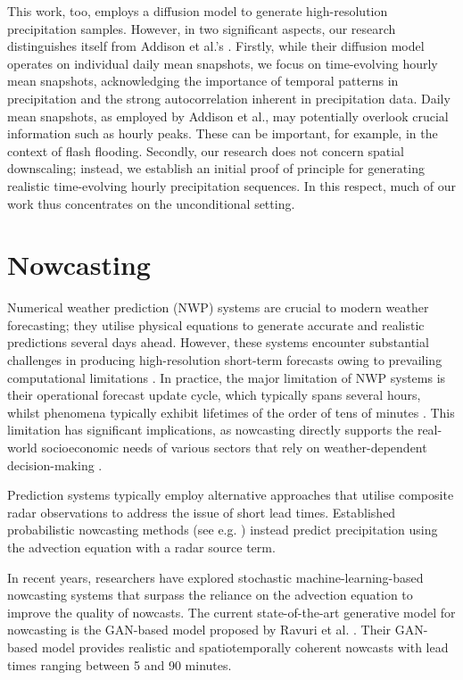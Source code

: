 \documentclass[ oneside,%
                    author={George Herbert},
                    degree={MSci},
                     title={Diffusion Models for Time-Evolving Precipitation Fields},
                  subtitle={}]{dissertation}
\begin{document}
This work, too, employs a diffusion model to generate high-resolution precipitation samples. However, in two significant aspects, our research distinguishes itself from Addison et al.'s \cite{Addison_Machine_Learning_Emulation}. Firstly, while their diffusion model operates on individual daily mean snapshots, we focus on time-evolving hourly mean snapshots, acknowledging the importance of temporal patterns in precipitation and the strong autocorrelation inherent in precipitation data. Daily mean snapshots, as employed by Addison et al., may potentially overlook crucial information such as hourly peaks. These can be important, for example, in the context of flash flooding. Secondly, our research does not concern spatial downscaling; instead, we establish an initial proof of principle for generating realistic time-evolving hourly precipitation sequences. In this respect, much of our work thus concentrates on the unconditional setting.

\section{Nowcasting}

Numerical weather prediction (NWP) systems are crucial to modern weather forecasting; they utilise physical equations to generate accurate and realistic predictions several days ahead. However, these systems encounter substantial challenges in producing high-resolution short-term forecasts owing to prevailing computational limitations \cite{Wilson_Nowcasting_Challenges}. In practice, the major limitation of NWP systems is their operational forecast update cycle, which typically spans several hours, whilst phenomena typically exhibit lifetimes of the order of tens of minutes \cite{Piece_Nowcasting}. This limitation has significant implications, as nowcasting directly supports the real-world socioeconomic needs of various sectors that rely on weather-dependent decision-making \cite{Wilson_Nowcasting_Challenges}.

Prediction systems typically employ alternative approaches that utilise composite radar observations to address the issue of short lead times. Established probabilistic nowcasting methods (see e.g. \cite{Bowler_STEPS}) instead predict precipitation using the advection equation with a radar source term.

In recent years, researchers have explored stochastic machine-learning-based nowcasting systems that surpass the reliance on the advection equation to improve the quality of nowcasts. The current state-of-the-art generative model for nowcasting is the GAN-based model proposed by Ravuri et al. \cite{Ravuri_Skillful_Precipitation_Nowcasting}. Their GAN-based model provides realistic and spatiotemporally coherent nowcasts with lead times ranging between 5 and 90 minutes.
\end{document}
